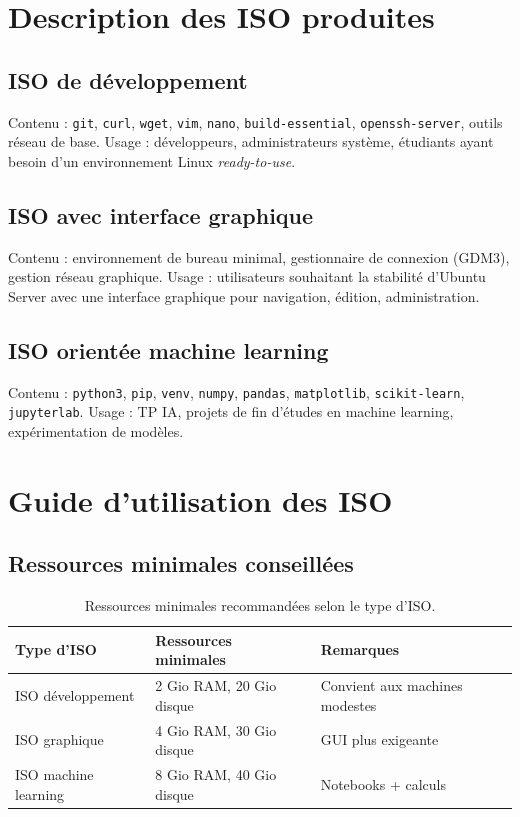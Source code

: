 \section{Description des ISO produites}

\subsection{ISO de développement}

Contenu : \texttt{git}, \texttt{curl}, \texttt{wget}, \texttt{vim}, \texttt{nano}, \texttt{build-essential}, \texttt{openssh-server}, outils réseau de base. Usage : développeurs, administrateurs système, étudiants ayant besoin d'un environnement Linux \emph{ready-to-use}.

\subsection{ISO avec interface graphique}

Contenu : environnement de bureau minimal, gestionnaire de connexion (GDM3), gestion réseau graphique. Usage : utilisateurs souhaitant la stabilité d'Ubuntu Server avec une interface graphique pour navigation, édition, administration.

\subsection{ISO orientée machine learning}

Contenu : \texttt{python3}, \texttt{pip}, \texttt{venv}, \texttt{numpy}, \texttt{pandas}, \texttt{matplotlib}, \texttt{scikit-learn}, \texttt{jupyterlab}. Usage : TP IA, projets de fin d'études en machine learning, expérimentation de modèles.

\section{Guide d'utilisation des ISO}

\subsection{Ressources minimales conseillées}

\begin{table}[H]
\centering
\small
\begin{tabular}{lll}
\toprule
\textbf{Type d'ISO} & \textbf{Ressources minimales} & \textbf{Remarques} \\
\midrule
ISO développement     & 2 Gio RAM, 20 Gio disque & Convient aux machines modestes \\
ISO graphique         & 4 Gio RAM, 30 Gio disque & GUI plus exigeante \\
ISO machine learning  & 8 Gio RAM, 40 Gio disque & Notebooks + calculs \\
\bottomrule
\end{tabular}
\caption{Ressources minimales recommandées selon le type d'ISO.}
\end{table}

